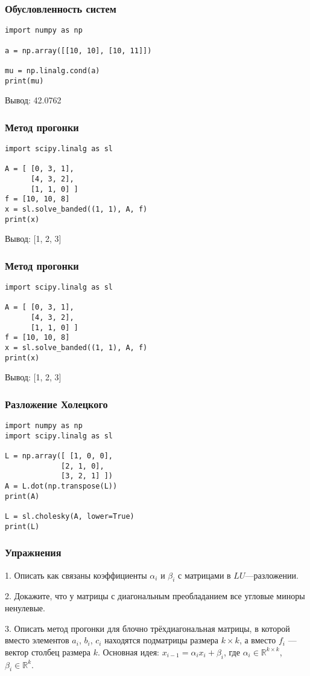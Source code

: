 \documentclass[10pt]{beamer}
\begin{document}
\begin{frame}[fragile]
\frametitle{Обусловленность систем}

\begin{lstlisting}
import numpy as np
 
a = np.array([[10, 10], [10, 11]])

mu = np.linalg.cond(a)
print(mu)
\end{lstlisting}

Вывод: 42.0762
\end{frame}

\begin{frame}[fragile]
\frametitle{Метод прогонки}

\begin{lstlisting}
import scipy.linalg as sl

A = [ [0, 3, 1],
      [4, 3, 2],
      [1, 1, 0] ]
f = [10, 10, 8]
x = sl.solve_banded((1, 1), A, f)
print(x)
\end{lstlisting}

Вывод: [1, 2, 3]
\end{frame}

\begin{frame}[fragile]
\frametitle{Метод прогонки}

\begin{lstlisting}
import scipy.linalg as sl

A = [ [0, 3, 1],
      [4, 3, 2],
      [1, 1, 0] ]
f = [10, 10, 8]
x = sl.solve_banded((1, 1), A, f)
print(x)
\end{lstlisting}

Вывод: [1, 2, 3]
\end{frame}

\begin{frame}[fragile]
\frametitle{Разложение Холецкого}
\begin{lstlisting}
import numpy as np
import scipy.linalg as sl

L = np.array([ [1, 0, 0],
             [2, 1, 0],
             [3, 2, 1] ])
A = L.dot(np.transpose(L))
print(A)

L = sl.cholesky(A, lower=True)
print(L)
\end{lstlisting}
\end{frame}

\begin{frame}[fragile]
\frametitle{Упражнения}

1. Описать как связаны коэффициенты $\alpha_{i}$ и $\beta_{i}$ с матрицами в $LU$---разложении.

2. Докажите, что у матрицы с диагональным преобладанием все угловые миноры ненулевые.

3. Описать метод прогонки для блочно трёхдиагональная матрицы, в которой вместо элементов $a_i$, $b_i$, $c_i$ находятся подматрицы размера $k \times k$, а вместо $f_i$ --- вектор столбец размера $k$. Основная идея: $x_{i-1} = \alpha_i x_i + \beta_i$, где $\alpha_i \in \mathbb{R}^{k \times k}$, $\beta_i \in \mathbb{R}^k$.

\end{frame}
\end{document}
